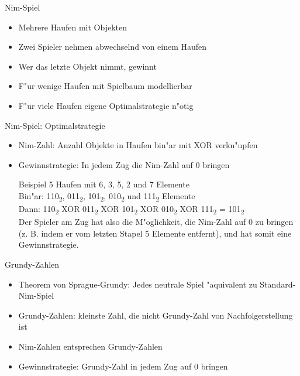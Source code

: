 \documentclass[18pt]{beamer}
\begin{document}
\begin{frame}{Nim-Spiel}
\begin{itemize}
\item Mehrere Haufen mit Objekten
\item Zwei Spieler nehmen abwechselnd von einem Haufen
\item Wer das letzte Objekt nimmt, gewinnt
\item F"ur wenige Haufen mit Spielbaum modellierbar
\item F"ur viele Haufen eigene Optimalstrategie n"otig
\end{itemize}
\end{frame}

\begin{frame}{Nim-Spiel: Optimalstrategie}
\begin{itemize}
\item Nim-Zahl: Anzahl Objekte in Haufen bin"ar mit XOR verkn"upfen
\item Gewinnstrategie: In jedem Zug die Nim-Zahl auf 0 bringen
\begin{block}{Beispiel}
5 Haufen mit 6, 3, 5, 2 und 7 Elemente \\
Bin"ar: 110\textsubscript{2}, 011\textsubscript{2}, 101\textsubscript{2}, 010\textsubscript{2} und 111\textsubscript{2} Elemente\\
Dann: 110\textsubscript{2} XOR 011\textsubscript{2} XOR 101\textsubscript{2} XOR 010\textsubscript{2} XOR 111\textsubscript{2} = 101\textsubscript{2} \\
Der Spieler am Zug hat also die M"oglichkeit, die Nim-Zahl auf 0 zu bringen (z. B. indem er vom letzten Stapel 5 Elemente entfernt), und hat somit eine Gewinnstrategie.
\end{block}
\end{itemize}
\end{frame}

\begin{frame}{Grundy-Zahlen}
\begin{itemize}
\item Theorem von Sprague-Grundy: Jedes neutrale Spiel "aquivalent zu Standard-Nim-Spiel
\item Grundy-Zahlen: kleinste Zahl, die nicht Grundy-Zahl von Nachfolgerstellung ist
\item Nim-Zahlen entsprechen Grundy-Zahlen
\item Gewinnstrategie: Grundy-Zahl in jedem Zug auf 0 bringen
\end{itemize}
\end{frame}
\end{document}
